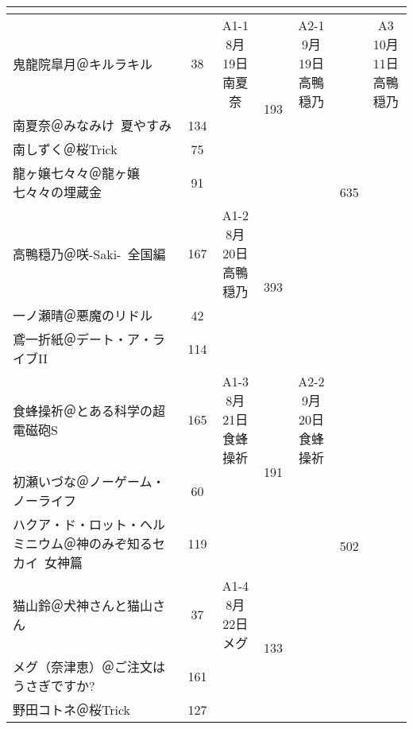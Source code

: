 \documentclass[UTF8, punct=kaiming, zihao=-4]{ctexbook}
\newcommand{\toppanb}{\toppanbe\CJKfamily{toppanb}}
\newcommand{\mincho}{\minchoe\CJKfamily{mincho}}
\newcommand{\Railgan}{とある科学の超電磁砲$\!$S}
\begin{document}
{\mincho{}
\begin{tabular}{|p{30em}|c|c|c|c|c|c|}
\hline
\multicolumn{1}{|c|}{\toppanb{Aブロック}} & \multicolumn{2}{c|}{\toppanb{1回戦}} & \multicolumn{2}{c|}{\toppanb{2回戦}} & \multicolumn{2}{c|}{\toppanb{3回戦}} \\ \hline
鬼龍院皐月＠キルラキル & 38 & \Cell{4}{A1-1\\8月19日\\南夏奈} & \multirow{4}{*}{193} & \Cell{7}{A2-1\\9月19日\\高鴨穏乃} & \multirow{7}{*}{635} & \Cell{13}{A3\\10月11日\\高鴨穏乃} \\ \cline{1-2}
南夏奈＠みなみけ~夏やすみ & 134 & & & & & \\ \cline{1-2}
南しずく＠桜Trick & 75 & & & & & \\ \cline{1-2}
龍ヶ嬢七々々＠龍ヶ嬢七々々の埋蔵金 & 91 & & & & & \\ \cline{1-4}
高鴨穏乃＠咲-Saki-~全国編 & 167 & \Cell{3}{A1-2\\8月20日\\高鴨穏乃} & \multirow{3}{*}{393} & & & \\ \cline{1-2}
一ノ瀬晴＠悪魔のリドル & 42 & & & & & \\ \cline{1-2}
鳶一折紙＠デート・ア・ライブII & 114 & & & & & \\ \cline{1-6}
食蜂操祈＠\Railgan & 165 & \Cell{3}{A1-3\\8月21日\\食蜂操祈} & \multirow{3}{*}{191} & \Cell{6}{A2-2\\9月20日\\食蜂操祈} & \multirow{6}{*}{502} & \\ \cline{1-2}
初瀬いづな＠ノーゲーム・ノーライフ & 60 & & & & & \\ \cline{1-2}
ハクア・ド・ロット・ヘルミニウム＠神のみぞ知るセカイ~女神篇 & 119 & & & & & \\ \cline{1-4}
猫山鈴＠犬神さんと猫山さん & 37 & \Cell{3}{A1-4\\8月22日\\メグ} & \multirow{3}{*}{133} & & & \\ \cline{1-2}
メグ（奈津恵）＠ご注文はうさぎですか? & 161 & & & & & \\ \cline{1-2}
野田コトネ＠桜Trick & 127 & & & & & \\ \hline
\end{tabular}

}
\end{document}
